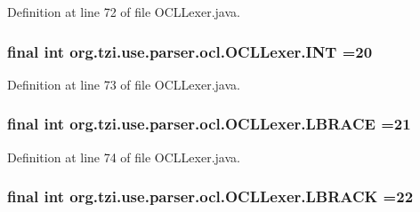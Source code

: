 Definition at line 72 of file O\-C\-L\-Lexer.\-java.

\hypertarget{classorg_1_1tzi_1_1use_1_1parser_1_1ocl_1_1_o_c_l_lexer_a6d9c6c94ac2ef52b00cd323457e91d29}{
\subsubsection[{I\-N\-T}]{\setlength{\rightskip}{0pt plus 5cm}final int org.\-tzi.\-use.\-parser.\-ocl.\-O\-C\-L\-Lexer.\-I\-N\-T =20\hspace{0.3cm}{\ttfamily [static]}}}\label{classorg_1_1tzi_1_1use_1_1parser_1_1ocl_1_1_o_c_l_lexer_a6d9c6c94ac2ef52b00cd323457e91d29}


Definition at line 73 of file O\-C\-L\-Lexer.\-java.

\hypertarget{classorg_1_1tzi_1_1use_1_1parser_1_1ocl_1_1_o_c_l_lexer_a874b01c6f3b8045e5eba53f918678567}{
\subsubsection[{L\-B\-R\-A\-C\-E}]{\setlength{\rightskip}{0pt plus 5cm}final int org.\-tzi.\-use.\-parser.\-ocl.\-O\-C\-L\-Lexer.\-L\-B\-R\-A\-C\-E =21\hspace{0.3cm}{\ttfamily [static]}}}\label{classorg_1_1tzi_1_1use_1_1parser_1_1ocl_1_1_o_c_l_lexer_a874b01c6f3b8045e5eba53f918678567}


Definition at line 74 of file O\-C\-L\-Lexer.\-java.

\hypertarget{classorg_1_1tzi_1_1use_1_1parser_1_1ocl_1_1_o_c_l_lexer_a8168b117d35393da7f6a99693925736d}{
\subsubsection[{L\-B\-R\-A\-C\-K}]{\setlength{\rightskip}{0pt plus 5cm}final int org.\-tzi.\-use.\-parser.\-ocl.\-O\-C\-L\-Lexer.\-L\-B\-R\-A\-C\-K =22\hspace{0.3cm}{\ttfamily [static]}}}\label{classorg_1_1tzi_1_1use_1_1parser_1_1ocl_1_1_o_c_l_lexer_a8168b117d35393da7f6a99693925736d}


